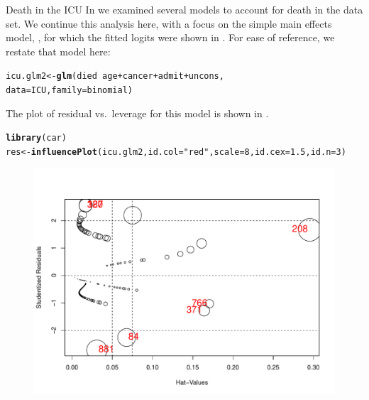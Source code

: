 \documentclass[11pt]{book}\usepackage[]{graphicx}\usepackage[]{color}
\makeatletter
\newcommand{\hlnum}[1]{\textcolor[rgb]{0.686,0.059,0.569}{#1}}%
\newcommand{\hlstr}[1]{\textcolor[rgb]{0.192,0.494,0.8}{#1}}%
\newcommand{\hlopt}[1]{\textcolor[rgb]{0,0,0}{#1}}%
\newcommand{\hlstd}[1]{\textcolor[rgb]{0.345,0.345,0.345}{#1}}%
\newcommand{\hlkwb}[1]{\textcolor[rgb]{0.69,0.353,0.396}{#1}}%
\newcommand{\hlkwc}[1]{\textcolor[rgb]{0.333,0.667,0.333}{#1}}%
\newcommand{\hlkwd}[1]{\textcolor[rgb]{0.737,0.353,0.396}{\textbf{#1}}}%
\newenvironment{kframe}{%
 \def\at@end@of@kframe{}%
 \ifinner\ifhmode%
  \def\at@end@of@kframe{\end{minipage}}%
  \begin{minipage}{\columnwidth}%
 \fi\fi%
 \def\FrameCommand##1{\hskip\@totalleftmargin \hskip-\fboxsep
 \colorbox{shadecolor}{##1}\hskip-\fboxsep
     \hskip-\linewidth \hskip-\@totalleftmargin \hskip\columnwidth}%
 \MakeFramed {\advance\hsize-\width
   \@totalleftmargin\z@ \linewidth\hsize
   \@setminipage}}%
 {\par\unskip\endMakeFramed%
 \at@end@of@kframe}
\newenvironment{knitrout}{}{} %
\renewenvironment{knitrout}{\small\renewcommand{\baselinestretch}{.85}}{} %
\makeatother
\begin{document}
\begin{Example}[icu2]{Death in the ICU}
In  we examined several models to account for death in the 
 data set. We continue this analysis here, with a focus on
the simple main effects model, , for which the fitted
logits were shown in .
For ease of reference, we restate that model here:
\begin{knitrout}
\color{fgcolor}\begin{kframe}
\begin{alltt}
\hlstd{icu.glm2} \hlkwb{<-} \hlkwd{glm}\hlstd{(died} \hlopt{~} \hlstd{age} \hlopt{+} \hlstd{cancer}  \hlopt{+} \hlstd{admit} \hlopt{+} \hlstd{uncons,}
                \hlkwc{data}\hlstd{=ICU ,} \hlkwc{family}\hlstd{=binomial)}
\end{alltt}
\end{kframe}
\end{knitrout}

The plot of residual vs.\  leverage for this model is shown in .
\begin{knitrout}
\color{fgcolor}\begin{kframe}
\begin{alltt}
\hlkwd{library}\hlstd{(car)}
\hlstd{res} \hlkwb{<-} \hlkwd{influencePlot}\hlstd{(icu.glm2,} \hlkwc{id.col}\hlstd{=}\hlstr{"red"}\hlstd{,} \hlkwc{scale}\hlstd{=}\hlnum{8}\hlstd{,} \hlkwc{id.cex}\hlstd{=}\hlnum{1.5}\hlstd{,} \hlkwc{id.n}\hlstd{=}\hlnum{3}\hlstd{)}
\end{alltt}
\end{kframe}\begin{figure}[!htbp]


\centerline{\includegraphics[width=.7\textwidth]{ch07/fig/icu2-inflplot-1} }


\end{figure}
\end{knitrout}
\end{Example}
\end{document}
